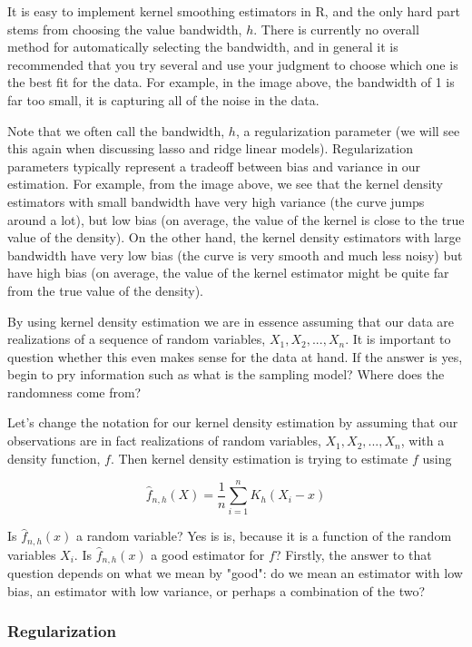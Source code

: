 It is easy to implement kernel smoothing estimators in R, and the only hard part stems from choosing the value bandwidth, $h$. There is currently no overall method for automatically selecting the bandwidth, and in general it is recommended that you try several and use your judgment to choose which one is the best fit for the data. For example, in the image above, the bandwidth of 1 is far too small, it is capturing all of the noise in the data. 

Note that we often call the bandwidth, $h$, a regularization parameter (we will see this again when discussing lasso and ridge linear models). Regularization parameters typically represent a tradeoff between bias and variance in our estimation. For example, from the image above, we see that the kernel density estimators with small bandwidth have very high variance (the curve jumps around a lot), but low bias (on average, the value of the kernel is close to the true value of the density). On the other hand, the kernel density estimators with large bandwidth have very low bias (the curve is very smooth and much less noisy) but have high bias (on average, the value of the kernel estimator might be quite far from the true value of the density). 




By using kernel density estimation we are in essence assuming that our data are realizations of a sequence of random variables, $X_1, X_2, ..., X_n$. It is important to question whether this even makes sense for the data at hand. If the answer is yes, begin to pry information such as what is the sampling model? Where does the randomness come from?

Let's change the notation for our kernel density estimation by assuming that our observations are in fact realizations of random variables, $X_1, X_2, ..., X_n$, with a density function, $f$. Then kernel density estimation is trying to estimate $f$ using

$$\hat{f}_{n, h}(X) = \frac{1}{n} \sum_{i=1}^n K_{h}(X_i - x)$$


Is $\hat{f}_{n,h}(x)$ a random variable? Yes is is, because it is a function of the random variables $X_i$. Is $\hat{f}_{n, h}(x)$ a good estimator for $f$? Firstly, the answer to that question depends on what we mean by "good": do we mean an estimator with low bias, an estimator with low variance, or perhaps a combination of the two?



\subsubsection*{Regularization}



